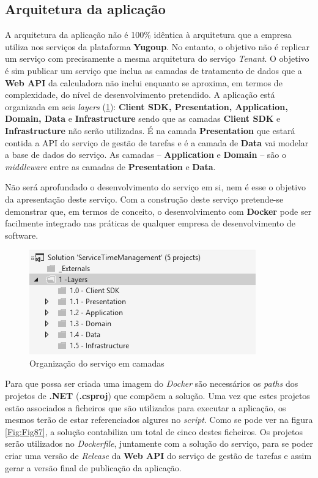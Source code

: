 \subsection{Arquitetura da aplicação}

\hspace{1cm}A arquitetura da aplicação não é 100\% idêntica à arquitetura que a empresa utiliza nos serviços da plataforma \textbf{Yugoup}. No entanto, o objetivo não é replicar um serviço com precisamente a mesma arquitetura do serviço \textit{Tenant}. O objetivo é sim publicar um serviço que inclua as camadas de tratamento de dados que a \textbf{Web API} da calculadora não inclui enquanto se aproxima, em termos de complexidade, do nível de desenvolvimento pretendido. A aplicação está organizada em seis \textit{layers} (\ref{Fig:Fig86}): \textbf{Client SDK, Presentation, Application, Domain, Data} e \textbf{Infrastructure} sendo que as camadas \textbf{Client SDK} e \textbf{Infrastructure} não serão utilizadas. É na camada \textbf{Presentation} que estará contida a API do serviço de gestão de tarefas e é a camada de \textbf{Data} vai modelar a base de dados do serviço. As camadas -- \textbf{Application} e \textbf{Domain} -- são o \textit{middleware} entre as camadas de \textbf{Presentation} e \textbf{Data}.

\hspace{1cm}Não será aprofundado o desenvolvimento do serviço em si, nem é esse o objetivo da apresentação deste serviço. Com a construção deste serviço pretende-se demonstrar que, em termos de conceito, o desenvolvimento com \textbf{Docker} pode ser facilmente integrado nas práticas de qualquer empresa de desenvolvimento de software.

\begin{figure}[hbt!]
\centering
\includegraphics[width=0.5\linewidth]{Cap7/TimeManagementLayers.png}
\caption{Organização do serviço em camadas}
\label{Fig:Fig86}
\end{figure}

\hspace{1cm}Para que possa ser criada uma imagem do \textit{Docker} são necessários os \textit{paths} dos projetos de \textbf{.NET} (\textbf{.csproj}) que compõem a solução. Uma vez que estes projetos estão associados a ficheiros que são utilizados para executar a aplicação, os mesmos terão de estar referenciados algures no \textit{script}. Como se pode ver na figura \ref{Fig:Fig87}, a solução contabiliza um total de cinco destes ficheiros. Os projetos serão utilizados no \textit{Dockerfile}, juntamente com a solução do serviço, para se poder criar uma versão de \textit{Release} da \textbf{Web API} do serviço de gestão de tarefas e assim gerar a versão final de publicação da aplicação.


